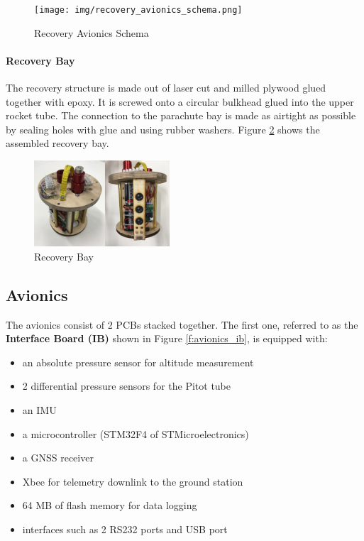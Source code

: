   \begin{figure}[h!]
 	\centering
        \texttt{[image: img/recovery\_avionics\_schema.png]}
        \caption{Recovery Avionics Schema}
        \label{f:recovery_avionics_schema}
 \end{figure}
 

\paragraph{Recovery Bay} 
 The recovery structure is made out of laser cut and milled plywood glued together with epoxy. It is screwed onto a circular bulkhead glued into the upper rocket tube. The connection to the parachute bay is made as airtight as possible by sealing holes with glue and using rubber washers.
Figure \ref{f:recovery_bay} shows the assembled recovery bay.
 \begin{figure}[h!]
 	\centering
        \includegraphics[width=0.45\textwidth]{img/recovery_bay.jpg}
        \caption{Recovery Bay}
        \label{f:recovery_bay}
 \end{figure}
 
 
\subsection{Avionics}
The avionics consist of 2 PCBs stacked together. The first one, referred to as the \textbf{Interface Board (IB)} shown in Figure \ref{f:avionics_ib}, is equipped with:
\begin{itemize}[noitemsep]
    \item an absolute pressure sensor for altitude measurement
    \item 2 differential pressure sensors for the Pitot tube
    \item an IMU
    \item a microcontroller (STM32F4 of STMicroelectronics)
    \item a GNSS receiver
    \item Xbee for telemetry downlink to the ground station
    \item 64 MB of flash memory for data logging
    \item interfaces such as 2 RS232 ports and USB port
\end{itemize}

